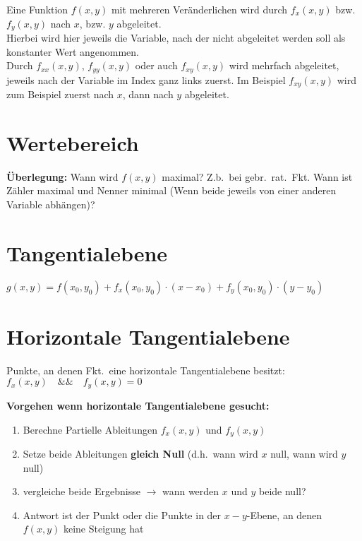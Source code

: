 \documentclass[12pt, a4paper]{scrreprt}
\begin{document}
Eine Funktion \(f(x, y)\) mit mehreren Veränderlichen wird durch \(f_x(x, y)\) bzw. \(f_y(x, y)\) nach \(x\), bzw. \(y\) abgeleitet.\\
Hierbei wird hier jeweils die Variable, nach der nicht abgeleitet werden soll als konstanter Wert angenommen.\\
Durch \(f_{xx}(x, y)\), \(f_{yy}(x, y)\) oder auch \(f_{xy}(x, y)\) wird mehrfach abgeleitet, jeweils nach der Variable im Index ganz links zuerst. Im Beispiel \(f_{xy}(x, y)\) wird zum Beispiel zuerst nach \(x\), dann nach \(y\) abgeleitet.

\section{Wertebereich}

\textbf{Überlegung:} Wann wird \(f(x,y)\) maximal? Z.b.\ bei gebr.\ rat.\ Fkt.\: Wann ist Zähler maximal und Nenner minimal (Wenn beide jeweils von einer anderen Variable abhängen)?

\section{Tangentialebene}

\(g(x,y) = f(x_0,y_0) + f_x(x_0,y_0) \cdot (x - x_0) + f_y(x_0,y_0) \cdot (y - y_0)\)

\section{Horizontale Tangentialebene}

Punkte, an denen Fkt.\ eine horizontale Tangentialebene besitzt: \(f_x(x,y) \quad \&\& \quad f_y(x,y) = 0\)

\textbf{Vorgehen wenn horizontale Tangentialebene gesucht:}

\begin{enumerate}
\item Berechne Partielle Ableitungen \(f_x(x,y)\) und \(f_y(x,y)\)
\item Setze beide Ableitungen \textbf{gleich Null} (d.h.\ wann wird \(x\) null, wann wird \(y\) null)
\item vergleiche beide Ergebnisse $\rightarrow$ wann werden \(x\) und \(y\) beide null?
\item Antwort ist der Punkt oder die Punkte in der \(x-y\)-Ebene, an denen \(f(x,y)\) keine Steigung hat
\end{enumerate}
\end{document}
